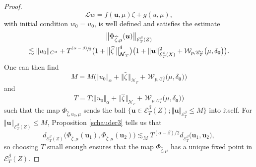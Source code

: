 \documentclass[JEP,XML,SOM,Unicode,published]{cedram}
\newcommand{\psfrac}[2]{\sfrac{(#1)}{#2}}
\theoremstyle{definition}
\newcommand{\bfzero}{\mathbf{0}}
\newcommand{\mcE}{\mathcal{E}}
\newcommand{\mcN}{\mathcal{N}}
\newcommand\mcW{\mathcal W}
\newcommand{\bsu}{\boldsymbol{u}}
\newcommand{\scrC}{\ensuremath{\mathscr{C}}}
\newcommand{\dab}{\mcE^\beta_T}
\newcommand{\norme}[1]{\Vert #1 \Vert}
\newcommand{\scrL}{\mathscr{L}}
\begin{document}
\begin{proof}
\[
\scrL w = f(\bsu,\mu) \zeta + g(u,\mu),
\]
with initial condition $w_0=u_0$, is well defined and satisfies the estimate
\begin{multline}\label{estimee111}
\big\Vert\Phi_{\widehat\zeta, \mu}(\bsu)\big\Vert_{\mcE^\beta_T(Z)}\\
\lesssim \norme{u_0}_{C^\alpha} + T^{\psfrac{\alpha-\beta}{2}}\bigl(1+\big\Vert\widehat\zeta\hspace{2pt}\big\Vert_{{\boldsymbol{\mcN}}_T}^4 \bigr)\bigl(1 + \norme\bsu_{\dab(X)}^2 + \mcW_{p,\scrC_T^\alpha}\bigl(\mu,\delta_\bfzero\bigr)\bigr).
\end{multline}
One can then find
\[
M = M\bigl(\norme{u_0}_\alpha+\hspace{1pt} \Vert\widehat\zeta\hspace{2pt}\Vert_{{\boldsymbol{\mcN}}_T} + \hspace{1pt}\mcW_{p,\scrC^\alpha_T}\bigl(\mu,\delta_\bfzero\bigr)\bigr)
\]
and
\[
T=T\bigl(\norme{u_0}_\alpha+ \hspace{1pt}\Vert\widehat\zeta\hspace{1pt}\Vert_{{\boldsymbol{\mcN}}_T}+ \hspace{1pt} \mcW_{p,\scrC^\alpha_T}\bigl(\mu,\delta_\bfzero\bigr)\bigr)
\]
such that the map $\Phi_{\widehat\zeta,u_0,\mu}$ sends the ball $\bigl\{ \bsu\in \mcE^\beta_T(Z); \norme\bsu_{\mcE^\beta_T}\leq M \bigr\}$ into itself. For $\norme\bsu_{\mcE^\beta_T(Z)}\leq M$, Proposition \ref{schauder3} tells us that
\[
d_{\mcE^\beta_T(Z)}\bigl(\Phi_{\widehat\zeta,\mu}(\bsu_1),\Phi_{\widehat\zeta,\mu}(\bsu_2)\bigr) \lesssim_M T^{(\alpha-\beta)/2} d_{\dab}\bigl(\bsu_1, \bsu_2\bigr),
\]
so choosing $T$ small enough ensures that the map $\Phi_{\widehat\zeta,\mu}$ has a unique fixed point in $\mcE^\beta_T(Z)$.


\end{proof}
\end{document}
